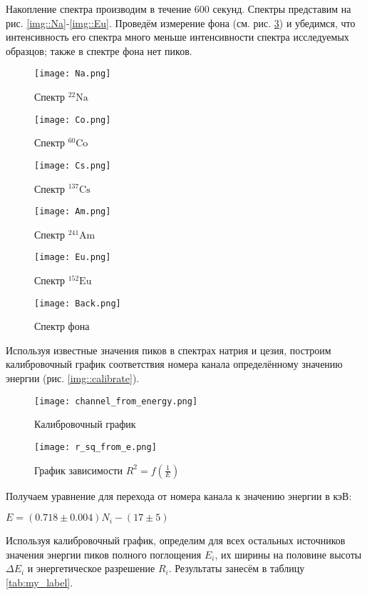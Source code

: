 Накопление спектра производим в течение 600 секунд. Спектры представим на рис.
\ref{img::Na}-\ref{img::Eu}. Проведём измерение фона (см. рис. \ref{img::Back}) и убедимся, что интенсивность его
спектра много меньше интенсивности спектра исследуемых образцов; также в спектре
фона нет пиков.


\begin{figure}
\begin{center}
  \texttt{[image: Na.png]}
  \caption{Спектр ${}^{22}{\text{Na}}$}
  \label{img::Na}
  \texttt{[image: Co.png]}
  \caption{Спектр ${}^{60}{\text{Co}}$}
  \label{img::Co}
\end{center}
\end{figure}

\begin{figure}
\begin{center}
  \texttt{[image: Cs.png]}
  \caption{Спектр ${}^{137}{\text{Cs}}$}
  \label{img::Cs}
  \texttt{[image: Am.png]}
  \caption{Спектр ${}^{241}{\text{Am}}$}
  \label{img::Am}
\end{center}
\end{figure}

\begin{figure}
\begin{center}
  \texttt{[image: Eu.png]}
  \caption{Спектр ${}^{152}{\text{Eu}}$}
  \label{img::Eu}
  \texttt{[image: Back.png]}
  \caption{Спектр фона}
  \label{img::Back}
\end{center}
\end{figure}
Используя известные значения пиков в спектрах натрия и цезия, построим
калибровочный график соответствия номера канала определённому значению энергии
(рис. \ref{img::calibrate}).

\begin{figure}[h!]
  \centering
  \texttt{[image: channel\_from\_energy.png]}
  \caption{Калибровочный график}
  \label{img::calibrate}
  \texttt{[image: r\_sq\_from\_e.png]}
  \caption{График зависимости $R^2 = f(\frac{1}{E})$}
  \label{img::Rsqrt}
\end{figure}

Получаем уравнение для перехода от номера канала к значению энергии в кэВ:
\begin{center}
    $E = (0.718 \pm 0.004)N_i - (17 \pm 5)$
\end{center}

Используя калибровочный график, определим для всех остальных источников значения
энергии пиков полного поглощения $E_i$, их ширины на половине высоты $\Delta
E_i$ и энергетическое разрешение $R_i$. Результаты занесём в таблицу \ref{tab:my_label}.


